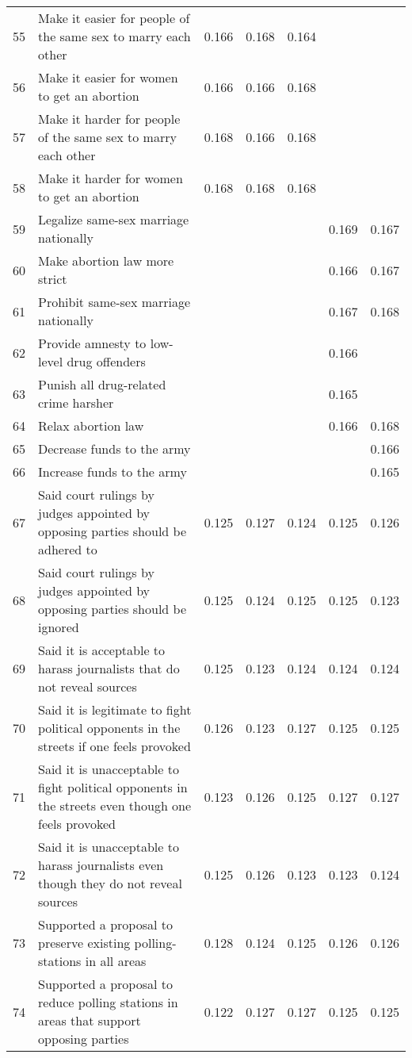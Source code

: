 \begin{longtable}{lp{7cm}ccccc}
  55 & Make it easier for people of the same sex to marry each other & 0.166 & 0.168 & 0.164 &  &  \\ 
  56 & Make it easier for women to get an abortion & 0.166 & 0.166 & 0.168 &  &  \\ 
  57 & Make it harder for people of the same sex to marry each other & 0.168 & 0.166 & 0.168 &  &  \\ 
  58 & Make it harder for women to get an abortion & 0.168 & 0.168 & 0.168 &  &  \\ 
  59 & Legalize same-sex marriage nationally &  &  &  & 0.169 & 0.167 \\ 
  60 & Make abortion law more strict &  &  &  & 0.166 & 0.167 \\ 
  61 & Prohibit same-sex marriage nationally &  &  &  & 0.167 & 0.168 \\ 
  62 & Provide amnesty to low-level drug offenders &  &  &  & 0.166 &  \\ 
  63 & Punish all drug-related crime harsher &  &  &  & 0.165 &  \\ 
  64 & Relax abortion law &  &  &  & 0.166 & 0.168 \\ 
  65 & Decrease funds to the army &  &  &  &  & 0.166 \\ 
  66 & Increase funds to the army &  &  &  &  & 0.165 \\ 
  67 & Said court rulings by judges appointed by opposing parties should be adhered to & 0.125 & 0.127 & 0.124 & 0.125 & 0.126 \\ 
  68 & Said court rulings by judges appointed by opposing parties should be ignored & 0.125 & 0.124 & 0.125 & 0.125 & 0.123 \\ 
  69 & Said it is acceptable to harass journalists that do not reveal sources & 0.125 & 0.123 & 0.124 & 0.124 & 0.124 \\ 
  70 & Said it is legitimate to fight political opponents in the streets if one feels provoked & 0.126 & 0.123 & 0.127 & 0.125 & 0.125 \\ 
  71 & Said it is unacceptable to fight political opponents in the streets even though one feels provoked & 0.123 & 0.126 & 0.125 & 0.127 & 0.127 \\ 
  72 & Said it is unacceptable to harass journalists even though they do not reveal sources & 0.125 & 0.126 & 0.123 & 0.123 & 0.124 \\ 
  73 & Supported a proposal to preserve existing polling-stations in all areas & 0.128 & 0.124 & 0.125 & 0.126 & 0.126 \\ 
  74 & Supported a proposal to reduce polling stations in areas that support opposing parties & 0.122 & 0.127 & 0.127 & 0.125 & 0.125 \\ 

\end{longtable}
